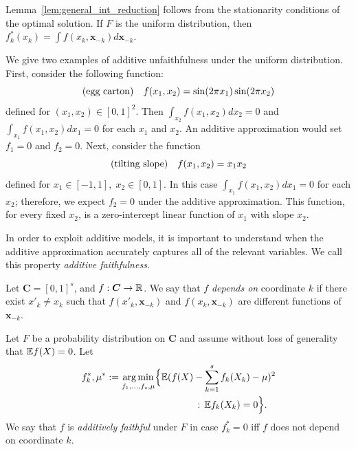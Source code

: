 Lemma~\ref{lem:general_int_reduction} follows from the stationarity
conditions of the optimal solution. If $F$ is the uniform distribution,
then $f^*_k(x_k) = \int f(x_k, \mathbf{x}_{-k})
d\mathbf{x}_{-k}$.

\begin{example} We give two examples of additive unfaithfulness under
  the uniform distribution. First, consider the following function:
\[
\textrm{(egg carton)} \quad f(x_1, x_2) = \sin( 2\pi x_1) \sin( 2 \pi x_2)
\]
defined for $(x_1, x_2) \in [0,1]^2$.  Then
$\int_{x_2} f(x_1, x_2) d x_2 = 0$ and
$\int_{x_1} f(x_1, x_2) d x_1 = 0$ for each $x_1$ and $x_2$. An additive approximation
would set $f_1 = 0$ and $f_2 = 0$.  Next, consider the function
\[
\textrm{(tilting slope)} \quad f(x_1, x_2) = x_1 x_2
\]
defined for $x_1 \in [-1,1],\; x_2 \in [0,1]$.  In this case
$\int_{x_1} f(x_1, x_2) d x_1 = 0$ for each $x_2$; therefore, we expect $f_2 = 0$ under the additive approximation. This function, for every fixed $x_2$, is a zero-intercept linear function of $x_1$ with slope $x_2$.
\end{example}

In order to exploit additive models, it is important to understand when the
additive approximation accurately captures all of the relevant variables.
We call this property \emph{additive faithfulness}.

\begin{definition}
  Let $\mathbf{C}=[0,1]^s$, and $f:\mbox{\boldmath $C$}\rightarrow {\mathbb R}$. We say
  that $f$ \emph{depends on} coordinate $k$ if there exist $x'_k \neq
  x_k$ such that $f(x'_k, \mathbf{x}_{-k})$ and $f(x_k,
  \mathbf{x}_{-k})$ are different functions of $\mathbf{x}_{-k}$.

Let $F$ be a probability distribution on $\mathbf{C}$ and
assume without loss of generality that ${\mathbb E} f(X) = 0$. Let 
\begin{equation}
\begin{split}
f_k^*, \mu^* := \mathop{\text{\rm arg\,min}}_{f_1,\ldots, f_s, \mu} \Bigl\{ 
             {\mathbb E} ( f(X) &- \sum_{k=1}^s f_k(X_k) -\mu )^2 \\
         &\,:\, {\mathbb E} f_k(X_k) = 0 \Bigr\}.
\end{split}
\end{equation}
We say that $f$ is \emph{additively faithful} under $F$ in case $f^*_k = 0$ iff $f$ does not depend on coordinate $k$. 
\end{definition}

